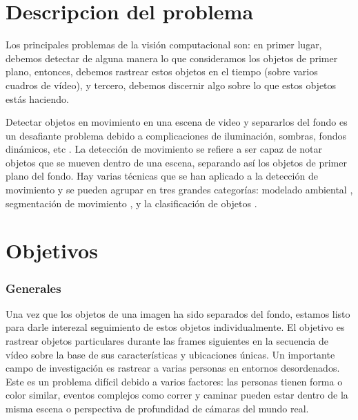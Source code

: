  
\section{Descripcion del problema}

Los principales problemas de la visión computacional son: en primer lugar, debemos detectar de alguna manera lo que consideramos los objetos de primer plano, entonces, debemos rastrear estos objetos en el tiempo (sobre varios cuadros de vídeo), y tercero, debemos discernir algo sobre lo que estos objetos estás haciendo. 
 
 
Detectar objetos en movimiento en una escena de video y separarlos del fondo es un desafiante problema debido a complicaciones de iluminación, sombras, fondos dinámicos, etc \cite{albiol2003robust}. La detección de movimiento se refiere a ser capaz de notar objetos que se mueven dentro de una escena, separando así los objetos de primer plano del fondo. Hay varias técnicas que se han aplicado a la detección de movimiento \cite{kaewtrakulpong2002improved} y se pueden agrupar en tres grandes categorías: modelado ambiental \cite{mittal2004motion}, segmentación de movimiento \cite{mittal2004motion}, y la clasificación de objetos \cite{mittal2004motion}.
 
  
\section{Objetivos}
  \subsubsection{Generales}
Una vez que los objetos  de una imagen ha sido separados del fondo, estamos listo para darle interezal seguimiento de estos objetos individualmente. El objetivo es rastrear objetos particulares durante las frames siguientes en la secuencia de vídeo sobre la base de sus características y ubicaciones únicas. Un importante campo de investigación es rastrear a varias personas en entornos desordenados. Este es un problema difícil debido a varios factores: las personas tienen forma o color similar, eventos complejos como correr y caminar pueden estar dentro de la misma escena o perspectiva de profundidad de cámaras del mundo real. 
 

